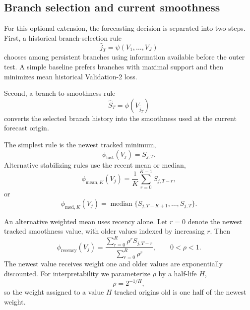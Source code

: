 \subsection{Branch selection and current smoothness}

For this optional extension, the forecasting decision is separated into two steps. First, a historical branch-selection rule
\begin{equation}
\label{eq:branch_selector}
\widehat j_T
=
\psi(V_1,\ldots,V_J)
\end{equation}
chooses among persistent branches using information available before the outer test. A simple baseline prefers branches with maximal support and then minimizes mean historical Validation-2 loss.

Second, a branch-to-smoothness rule
\begin{equation}
\label{eq:phi_rule}
\widehat S_T
=
\phi(V_{\widehat j_T})
\end{equation}
converts the selected branch history into the smoothness used at the current forecast origin.

The simplest rule is the newest tracked minimum,
\begin{equation}
\label{eq:rule_latest}
\phi_{\mathrm{last}}(V_j)=S_{j,T}.
\end{equation}
Alternative stabilizing rules use the recent mean or median,
\begin{equation}
\label{eq:rule_recent_mean}
\phi_{\mathrm{mean},K}(V_j)
=
\frac1K
\sum_{r=0}^{K-1}
S_{j,T-r},
\end{equation}
or
\begin{equation}
\label{eq:rule_recent_median}
\phi_{\mathrm{med},K}(V_j)
=
\operatorname{median}
\{S_{j,T-K+1},\ldots,S_{j,T}\}.
\end{equation}

An alternative weighted mean uses recency alone. Let $r=0$ denote the newest tracked smoothness value, with older values indexed by increasing $r$. Then
\begin{equation}
\label{eq:rule_recency}
\phi_{\mathrm{recency}}(V_j)
=
\frac{
\sum_{r=0}^{R}\rho^r S_{j,T-r}
}{
\sum_{r=0}^{R}\rho^r
},
\qquad
0<\rho<1.
\end{equation}
The newest value receives weight one and older values are exponentially discounted. For interpretability we parameterize $\rho$ by a half-life $H$,
\begin{equation}
\label{eq:recency_half_life}
\rho=2^{-1/H},
\end{equation}
so the weight assigned to a value $H$ tracked origins old is one half of the newest weight.

